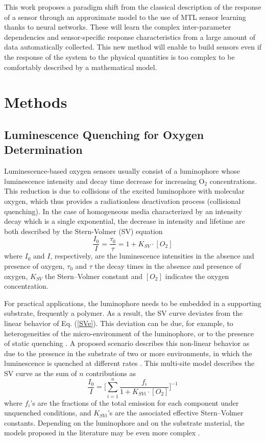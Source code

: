 \documentclass[sensors,article,submit,moreauthors,pdftex,10pt,a4paper]{Definitions/mdpi}
\begin{document}
This work proposes a paradigm shift from the classical description of the response of a sensor through an approximate model to the use of MTL sensor learning thanks to neural networks. 
These will learn the complex inter-parameter dependencies and sensor-specific response characteristics from a large amount of data automatically collected. This new method will enable to build sensors even if the response of the system to the physical quantities is too complex to be comfortably described by a mathematical model.


\section{Methods}
\label{sec:methods}

\subsection{Luminescence Quenching for Oxygen Determination}
\label{Theory}

Luminescence-based oxygen sensors usually consist of a luminophore whose luminescence intensity and decay time decrease for increasing O$_2$ concentrations. This reduction is due to collisions of the excited luminophore with molecular oxygen, which thus provides a radiationless deactivation process (collisional quenching). 
In the case of homogeneous media characterized by an intensity decay which is a single exponential, the decrease in intensity and lifetime are both described by the Stern-Volmer (SV) equation \cite{Lakowicz2006}
\begin{equation}
\frac{I_0}{I}=\frac{\tau_0}{\tau}=1+K_{SV} \cdot \left[O_2\right]
\label{SVe}
\end{equation}
where $I_0$ and $I$, respectively, are the luminescence intensities in the absence and presence of oxygen, $\tau_0$ and $\tau$ the decay times in the absence and presence of oxygen, $K_{SV}$ the Stern–Volmer constant and $\left[O_2\right]$ indicates the oxygen concentration.

For practical applications, the luminophore needs to be embedded in a supporting substrate, frequently a polymer. As a result, the SV curve deviates from the linear behavior of Eq. (\ref{SVe}). This deviation can be due, for example, to heterogeneities of the micro-environment of the luminophore, or to the presence of static quenching \cite{Wang2014}. A proposed scenario describes this non-linear behavior as due to the presence in the substrate of two or more environments, in which the luminescence is quenched at different rates \cite{Carraway1991,Demas1995}. This multi-site model describes the SV curve as the sum of $n$ contributions as
\begin{equation}
\frac{I_0}{I}=\bigg[ \sum_{i=1}^n
\frac{f_i}{1+K_{SVi} \cdot \left[O_2\right]}
\bigg]^{-1}
\label{SVe2}
\end{equation}
where $f_i$'s are the fractions of the total emission for each component under unquenched conditions, and $K_{SVi}$'s are the associated effective Stern–Volmer constants. Depending on the luminophore and on the substrate material, the models proposed in the literature may be even more complex \cite{Demas1995,Hartmann1995,Mills1999}.
\end{document}
